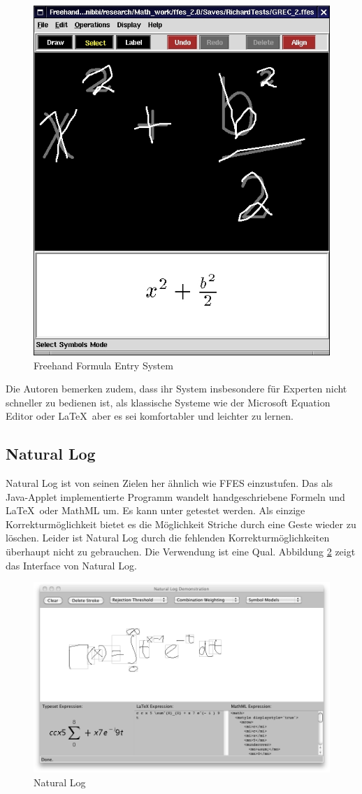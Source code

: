 \begin{figure}[htbp]
  \begin{center}
    \includegraphics[width=.4\textwidth]{figures/ffes.png}
  \end{center}
  \caption{Freehand Formula Entry System}
  \label{fig:ffes}
\end{figure}

Die Autoren bemerken zudem, dass ihr System insbesondere für Experten nicht schneller zu bedienen ist, als klassische Systeme wie der Microsoft Equation Editor oder \LaTeX~aber es sei komfortabler und leichter zu lernen.

\subsection{Natural Log}
\label{sub:natural-log}

Natural Log ist von seinen Zielen her ähnlich wie FFES einzustufen. Das als Java-Applet implementierte Programm wandelt handgeschriebene Formeln und \LaTeX~oder MathML um. Es kann unter \cite{natural-log} getestet werden. Als einzige Korrekturmöglichkeit bietet es die Möglichkeit Striche durch eine Geste wieder zu löschen. Leider ist Natural Log durch die fehlenden Korrekturmöglichkeiten überhaupt nicht zu gebrauchen. Die Verwendung ist eine Qual. Abbildung \ref{fig:natural-log} zeigt das Interface von Natural Log.

\begin{figure}[htbp]
  \begin{center}
    \includegraphics[width=.8\textwidth]{figures/natural-log.png}
  \end{center}
  \caption{Natural Log}
  \label{fig:natural-log}
\end{figure}

